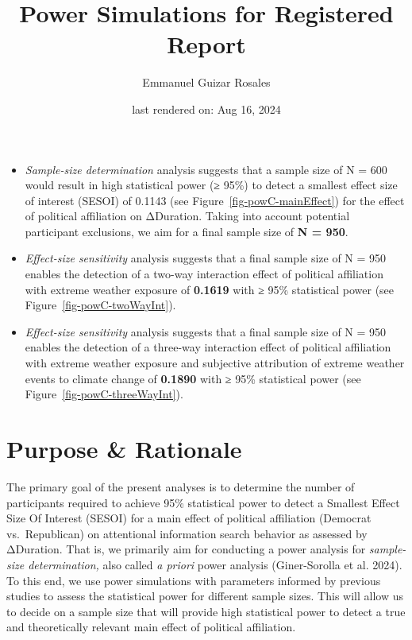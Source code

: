 \documentclass[
  letterpaper,
  DIV=11,
  numbers=noendperiod]{scrartcl}
\title{Power Simulations for Registered Report}
\author{Emmanuel Guizar Rosales}
\date{last rendered on: Aug 16, 2024}
\begin{document}
\maketitle

\begin{tcolorbox}[enhanced jigsaw, colbacktitle=quarto-callout-note-color!10!white, colframe=quarto-callout-note-color-frame, coltitle=black, bottomrule=.15mm, opacityback=0, arc=.35mm, left=2mm, breakable, colback=white, leftrule=.75mm, opacitybacktitle=0.6, bottomtitle=1mm, toptitle=1mm, titlerule=0mm, rightrule=.15mm, title=\textcolor{quarto-callout-note-color}{\faInfo}\hspace{0.5em}{Summary}, toprule=.15mm]

\begin{itemize}
\item
  \emph{Sample-size determination} analysis suggests that a sample size
  of N = 600 would result in high statistical power (≥ 95\%) to detect a
  smallest effect size of interest (SESOI) of 0.1143 (see
  Figure~\ref{fig-powC-mainEffect}) for the effect of political
  affiliation on ΔDuration. Taking into account potential participant
  exclusions, we aim for a final sample size of \textbf{N = 950}.
\item
  \emph{Effect-size sensitivity} analysis suggests that a final sample
  size of N = 950 enables the detection of a two-way interaction effect
  of political affiliation with extreme weather exposure of
  \textbf{0.1619} with ≥ 95\% statistical power (see
  Figure~\ref{fig-powC-twoWayInt}).
\item
  \emph{Effect-size sensitivity} analysis suggests that a final sample
  size of N = 950 enables the detection of a three-way interaction
  effect of political affiliation with extreme weather exposure and
  subjective attribution of extreme weather events to climate change of
  \textbf{0.1890} with ≥ 95\% statistical power (see
  Figure~\ref{fig-powC-threeWayInt}).
\end{itemize}

\end{tcolorbox}

\section{Purpose \& Rationale}\label{purpose-rationale}

The primary goal of the present analyses is to determine the number of
participants required to achieve 95\% statistical power to detect a
Smallest Effect Size Of Interest (SESOI) for a main effect of political
affiliation (Democrat vs.~Republican) on attentional information search
behavior as assessed by ΔDuration. That is, we primarily aim for
conducting a power analysis for \emph{sample-size determination,} also
called \emph{a priori} power analysis (Giner-Sorolla et al. 2024). To
this end, we use power simulations with parameters informed by previous
studies to assess the statistical power for different sample sizes. This
will allow us to decide on a sample size that will provide high
statistical power to detect a true and theoretically relevant main
effect of political affiliation.
\end{document}
